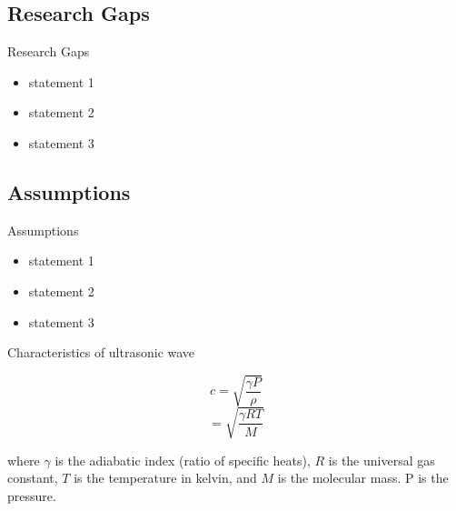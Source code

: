 \documentclass{beamer}
\begin{document}
\subsection{Research Gaps}
\begin{frame}{Research Gaps}
     \begin{itemize}
       
       \item statement 1
       \item statement 2
       \item statement 3
   \end{itemize}
\end{frame}

\subsection{Assumptions}
\begin{frame}{Assumptions}
     \begin{itemize}
       
       \item statement 1
       \item statement 2
       \item statement 3
   \end{itemize}
\end{frame}





\begin{frame}{Characteristics of ultrasonic wave}
    
         \begin{equation*}
      c = \sqrt{\frac{\gamma P}{\rho}} 
         \end{equation*}
       \begin{equation}
         = \sqrt{\frac{\gamma RT}{M}}
      \end{equation}
         
where $\gamma$ is the adiabatic index (ratio of specific heats), $R$ is the universal gas constant, $T$ is the temperature in kelvin, and $M$ is the molecular mass. P is the pressure\footnotemark. 
\end{frame}
\end{document}
